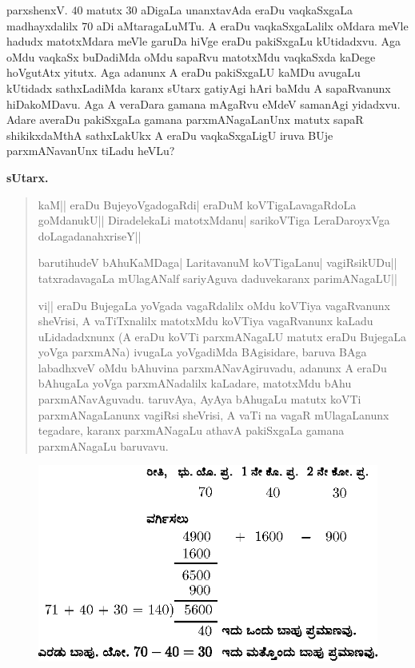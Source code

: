 parxshenxV. $40$ matutx $30$ aDigaLa unanxtavAda eraDu vaqkaSxgaLa
madhayxdalilx $70$ aDi aMtaragaLuMTu. A eraDu vaqkaSxgaLalilx oMdara
meVle hadudx matotxMdara meVle garuDa hiVge eraDu pakiSxgaLu
kUtidadxvu. Aga oMdu vaqkaSx buDadiMda oMdu sapaRvu matotxMdu
vaqkaSxda kaDege hoVgutAtx yitutx. Aga adanunx A eraDu pakiSxgaLU
kaMDu avugaLu kUtidadx sathxLadiMda karanx sUtarx gatiyAgi hAri baMdu
A sapaRvanunx hiDakoMDavu. Aga A veraDara gamana mAgaRvu eMdeV
samanAgi yidadxvu. Adare averaDu pakiSxgaLa gamana parxmANagaLanUnx
matutx sapaR shikikxdaMthA sathxLakUkx A eraDu vaqkaSxgaLigU iruva
BUje parxmANavanUnx tiLadu heVLu?

\medskip
\begin{center}
{\large\bf sUtarx.}
\end{center}

\begin{verse}
kaM|| eraDu BujeyoVgadogaRdi| eraDuM koVTigaLavagaRdoLa goMdanukU||
DiradelekaLi matotxMdanu| sarikoVTiga LeraDaroyxVga
doLagadanahxriseY||

barutihudeV bAhuKaMDaga| LaritavanuM koVTigaLanu| vagiRsikUDu||
tatxradavagaLa mUlagANalf sariyAguva daduvekaranx parimANagaLU||

vi|| eraDu BujegaLa yoVgada vagaRdalilx oMdu koVTiya vagaRvanunx
sheVrisi, A vaTiTxnalilx matotxMdu koVTiya vagaRvanunx kaLadu
uLidadadxnunx (A eraDu koVTi parxmANagaLU matutx eraDu BujegaLa yoVga
parxmANa) ivugaLa yoVgadiMda BAgisidare, baruva BAga labadhxveV oMdu
bAhuvina parxmANavAgiruvadu, adanunx A eraDu bAhugaLa yoVga
parxmANadalilx kaLadare, matotxMdu bAhu parxmANavAguvadu. taruvAya,
AyAya bAhugaLu matutx koVTi parxmANagaLanunx vagiRsi sheVrisi, A vaTi
na vagaR mUlagaLanunx tegadare, karanx parxmANagaLu athavA pakiSxgaLa
gamana parxmANagaLu baruvavu.
\end{verse}

\begin{figure}[H]
\centering
\includegraphics[scale=1.1]{figure/fig30.eps}
\end{figure}

